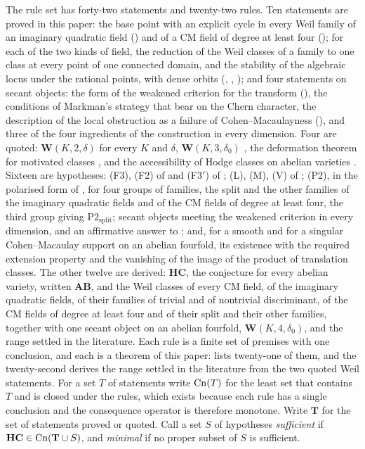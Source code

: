 \begin{setupenv}\label{setup:rules}
The rule set has forty-two statements and twenty-two rules. Ten statements
are proved in this paper: the base point with an explicit cycle in every Weil
family of an imaginary quadratic field () and of a CM
field of degree at least four (); for each of the two
kinds of field, the reduction of the Weil classes of a family to one class at
every point of one connected domain, and the stability of the algebraic locus
under the rational points, with dense orbits (,
, ); and four statements on
secant objects: the form of the weakened criterion for the transform
(), the conditions of Markman's strategy that bear on the
Chern character, the description of the local obstruction as a failure of
Cohen--Macaulayness (), and three of the four
ingredients of the construction in every dimension. Four are quoted:
$\mathbf{W}(K,2,\delta)$ for every $K$ and $\delta$, $\mathbf{W}(K,3,\delta_{0})$
\cite{Mar25a,Mar25b}, the deformation theorem for motivated classes
\cite[Th\'eor\`eme~0.5]{And96b}, and the accessibility of Hodge classes on
abelian varieties \cite[\S5.1, Theorem~3]{Mil20}. Sixteen are hypotheses:
(F3), (F2) of  and (F3$'$) of ;
(L), (M), (V) of ; (P2), in the polarised form of
, for four groups of families, the split and the other
families of the imaginary quadratic fields and of the CM fields of degree at
least four, the third group giving $\mathrm{P2}_{\mathrm{split}}$; secant
objects meeting the weakened criterion in every dimension, and an affirmative
answer to \cite[Question~11.4]{Mar25b}; and, for a smooth and for a singular
Cohen--Macaulay support on an abelian fourfold, its existence with the
required extension property and the vanishing of the image of the product of
translation classes. The other twelve are derived: $\mathbf{HC}$, the
conjecture for every abelian variety, written $\mathbf{AB}$, and the Weil
classes of every CM field, of the imaginary quadratic fields, of their
families of trivial and of nontrivial discriminant, of the CM fields of
degree at least four and of their split and their other families, together
with one secant object on an abelian fourfold, $\mathbf{W}(K,4,\delta_{0})$,
and the range settled in the literature. Each rule is a finite set of
premises with one conclusion, and each is a theorem of this paper:
 lists twenty-one of them, and the twenty-second derives the
range settled in the literature from the two quoted Weil statements. For a
set $T$ of statements write $\mathrm{Cn}(T)$ for the least set that contains $T$ and
is closed under the rules, which exists because each rule has a single
conclusion and the consequence operator is therefore monotone. Write
$\mathbf{T}$ for the set of statements proved or quoted. Call a set $S$ of
hypotheses \emph{sufficient} if $\mathbf{HC}\in\mathrm{Cn}(\mathbf{T}\cup S)$, and
\emph{minimal} if no proper subset of $S$ is sufficient.
\end{setupenv}

